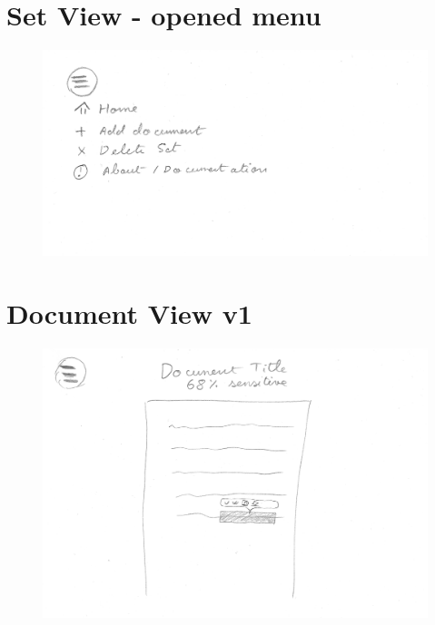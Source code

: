 \documentclass[\version]{l4proj}
\begin{document}
\begin{appendices}
    \section{Set View - opened menu}\label{fig:set-view-opened-menu-wireframe}
    \begin{figure}[H]
        \centering
        \includegraphics[width=\linewidth]{images/wireframes/set-menu.jpg}
    \end{figure}
    \section{Document View v1}\label{fig:document-view-alternative-wireframe}
    \begin{figure}[H]
        \centering
        \includegraphics[width=\linewidth]{images/wireframes/page.png}
    \end{figure}

\end{appendices}
\end{document}
